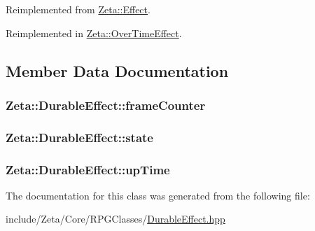 Reimplemented from \hyperlink{classZeta_1_1Effect_a85a3bc561d4280c6dc042f898e2f620e}{Zeta\+::\+Effect}.



Reimplemented in \hyperlink{classZeta_1_1OverTimeEffect_aedb8e15db2f8320f951fed874cdb0c4c}{Zeta\+::\+Over\+Time\+Effect}.



\subsection{Member Data Documentation}
\hypertarget{classZeta_1_1DurableEffect_ae4d3f95cb12a14ab8b592e3344643b9d}{
\subsubsection[{frame\+Counter}]{ Zeta\+::\+Durable\+Effect\+::frame\+Counter\hspace{0.3cm}{\ttfamily [protected]}}}\label{classZeta_1_1DurableEffect_ae4d3f95cb12a14ab8b592e3344643b9d}
\hypertarget{classZeta_1_1DurableEffect_a4ab32aaf7391e368086aba8e2030d9f6}{
\subsubsection[{state}]{ Zeta\+::\+Durable\+Effect\+::state\hspace{0.3cm}{\ttfamily [protected]}}}\label{classZeta_1_1DurableEffect_a4ab32aaf7391e368086aba8e2030d9f6}
\hypertarget{classZeta_1_1DurableEffect_ab8ee9c3e4b0a65c2c150b3baadd2ca5c}{
\subsubsection[{up\+Time}]{ Zeta\+::\+Durable\+Effect\+::up\+Time\hspace{0.3cm}{\ttfamily [protected]}}}\label{classZeta_1_1DurableEffect_ab8ee9c3e4b0a65c2c150b3baadd2ca5c}


The documentation for this class was generated from the following file\+:\begin{DoxyCompactItemize}
\item 
include/\+Zeta/\+Core/\+R\+P\+G\+Classes/\hyperlink{DurableEffect_8hpp}{Durable\+Effect.\+hpp}\end{DoxyCompactItemize}
